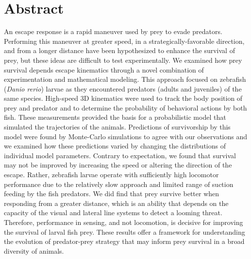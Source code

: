 \documentclass[]{rsos}%
\begin{document}
\section*{Abstract}
An escape response is a rapid maneuver used by prey to evade predators. 
Performing this maneuver at greater speed, in a strategically-favorable direction, and from a longer distance have been hypothesized to enhance the survival of prey, but these ideas are difficult to test experimentally.
We examined how prey survival depends escape kinematics through a novel combination of experimentation and mathematical modeling. 
This approach focused on zebrafish (\textit{Danio rerio}) larvae as they encountered predators (adults and juveniles) of the same species.
High-speed 3D kinematics were used to track the body position of prey and predator and to determine the probability of behavioral actions by both fish.
These measurements provided the basis for a probabilistic model that simulated the trajectories of the animals.
Predictions of survivorship by this model were found by Monte-Carlo simulations to agree with our observations and we examined how these predictions varied by changing the distributions of individual model parameters.
Contrary to expectation, we found that survival may not be improved by increasing the speed or altering the direction of the escape.
Rather, zebrafish larvae operate with sufficiently high locomotor performance due to the relatively slow approach and limited range of suction feeding by the fish predators.
We did find that prey survive better when responding from a greater distance, which is an ability that depends on the capacity of the visual and lateral line systems to detect a looming threat.
Therefore, performance in sensing, and not locomotion, is decisive for improving the survival of larval fish prey.
These results offer a framework for understanding the evolution of predator-prey strategy that may inform prey survival in a broad diversity of animals.
\end{document}
